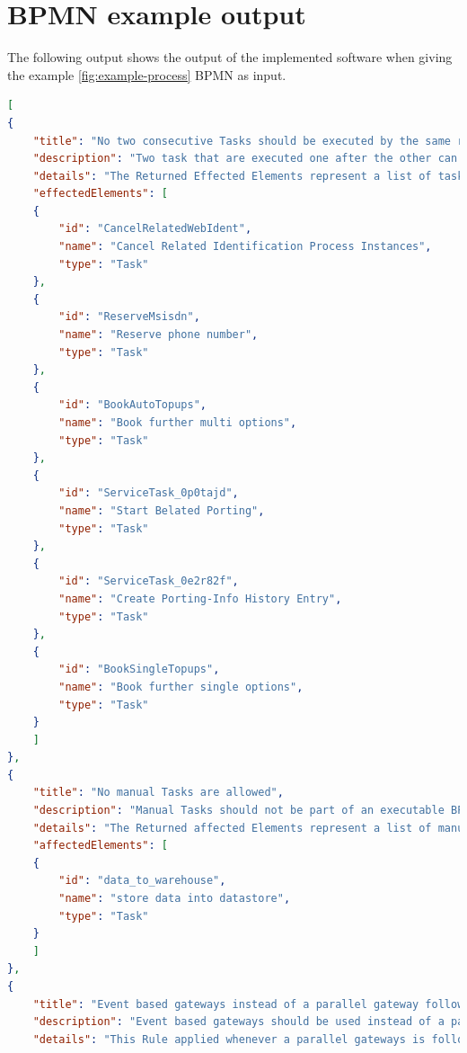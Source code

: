 \section{BPMN example output}\label{app-output}
The following output shows the output of the implemented software when giving the example \ref{fig:example-process} BPMN as input.
\begin{lstlisting}[breaklines=true, language=json]
[
{
	"title": "No two consecutive Tasks should be executed by the same resource",
	"description": "Two task that are executed one after the other can be merged if they have the same enitity executing the Task. In case of User tasks this means the same usergroup is executing this task. Automated Tasks that follow each other should also always be merged to minimize flownodes.",
	"details": "The Returned Effected Elements represent a list of tasks that can be merged with its direct successor.In case that three or more tasks can be merged, this algorithm will return every Task that can be mergedwith its successor on its own. Therefore if \"task1\" , \"task2\" and \"task3\" can be merged all together, this algorithm will \"task2\" and \"task3\" as effected elements",
	"effectedElements": [
	{
		"id": "CancelRelatedWebIdent",
		"name": "Cancel Related Identification Process Instances",
		"type": "Task"
	},
	{
		"id": "ReserveMsisdn",
		"name": "Reserve phone number",
		"type": "Task"
	},
	{
		"id": "BookAutoTopups",
		"name": "Book further multi options",
		"type": "Task"
	},
	{
		"id": "ServiceTask_0p0tajd",
		"name": "Start Belated Porting",
		"type": "Task"
	},
	{
		"id": "ServiceTask_0e2r82f",
		"name": "Create Porting-Info History Entry",
		"type": "Task"
	},
	{
		"id": "BookSingleTopups",
		"name": "Book further single options",
		"type": "Task"
	}
	]
},
{
	"title": "No manual Tasks are allowed",
	"description": "Manual Tasks should not be part of an executable BPMN diagram",
	"details": "The Returned affected Elements represent a list of manual tasks in the given diagram",
	"affectedElements": [
	{
		"id": "data_to_warehouse",
		"name": "store data into datastore",
		"type": "Task"
	}
	]
},
{
	"title": "Event based gateways instead of a parallel gateway followed by exclusive gateways",
	"description": "Event based gateways should be used instead of a parallel gateway followed by one or more exclusive gateways",
	"details": "This Rule applied whenever a parallel gateways is followed by one or more exclusive gateways. The returned affected Elements are a list of parallel gateways that are followed by one or more exclusive gateways in the given diagram",

\end{lstlisting}
